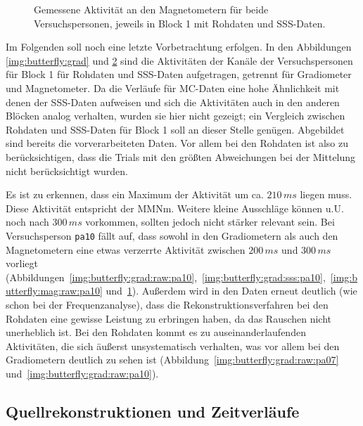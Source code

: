 \documentclass[doc,a4paper,12pt]{apa6}
\begin{document}
\begin{figure}
\begin{subfigure}[c]{0.36\textwidth}
    \label{img:butterfly:mag:sss:pa10}
  \end{subfigure}
  \vspace*{3mm}
  \captionsetup{justification=justified}
  \caption[Gemessene Aktivität an den Magnetometern]{Gemessene Aktivität an den Magnetometern für beide Versuchspersonen, jeweils in Block 1 mit Rohdaten und SSS-Daten.}
  \label{img:butterfly:mag}
\end{figure}

Im Folgenden soll noch eine letzte Vorbetrachtung erfolgen. In den Abbildungen \ref{img:butterfly:grad} und \ref{img:butterfly:mag} sind die Aktivitäten der Kanäle der Versuchspersonen für Block 1 für Rohdaten und SSS-Daten aufgetragen, getrennt für Gradiometer und Magnetometer. Da die Verläufe für MC-Daten eine hohe Ähnlichkeit mit denen der SSS-Daten aufweisen und sich die Aktivitäten auch in den anderen Blöcken analog verhalten, wurden sie hier nicht gezeigt; ein Vergleich zwischen Rohdaten und SSS-Daten für Block 1 soll an dieser Stelle genügen. Abgebildet sind bereits die vorverarbeiteten Daten. Vor allem bei den Rohdaten ist also zu berücksichtigen, dass die Trials mit den größten Abweichungen bei der Mittelung nicht berücksichtigt wurden.

Es ist zu erkennen, dass ein Maximum der Aktivität um ca. $210\,ms$ liegen muss. Diese Aktivität entspricht der MMNm. Weitere kleine Ausschläge können u.U. noch nach $300\,ms$ vorkommen, sollten jedoch nicht stärker relevant sein. Bei Versuchsperson \texttt{pa10} fällt auf, dass sowohl in den Gradiometern als auch den Magnetometern eine etwas verzerrte Aktivität zwischen $200\,ms$ und $300\,ms$ vorliegt (Abbildungen~\ref{img:butterfly:grad:raw:pa10},~\ref{img:butterfly:grad:sss:pa10},~\ref{img:butterfly:mag:raw:pa10} und~\ref{img:butterfly:mag:sss:pa10}). Außerdem wird in den Daten erneut deutlich (wie schon bei der Frequenzanalyse), dass die Rekonstruktionsverfahren bei den Rohdaten eine gewisse Leistung zu erbringen haben, da das Rauschen nicht unerheblich ist. Bei den Rohdaten kommt es zu auseinanderlaufenden Aktivitäten, die sich äußerst unsystematisch verhalten, was vor allem bei den Gradiometern deutlich zu sehen ist (Abbildung~\ref{img:butterfly:grad:raw:pa07} und~\ref{img:butterfly:grad:raw:pa10}).

\subsection{Quellrekonstruktionen und Zeitverläufe}
\end{document}
